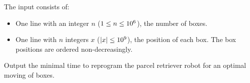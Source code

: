 \begin{Input}
    The input consists of:
    \begin{itemize}
        \item One line with an integer $n$ ($1\leq n\leq 10^6$), the number of boxes.
        \item One line with $n$ integers $x$ ($\left| x \right| \leq 10^9$),
            the position of each box.
            The box positions are ordered non-decreasingly.
    \end{itemize}
\end{Input}

\begin{Output}
    Output the minimal time to reprogram the parcel retriever robot for an optimal moving of boxes.
\end{Output}
